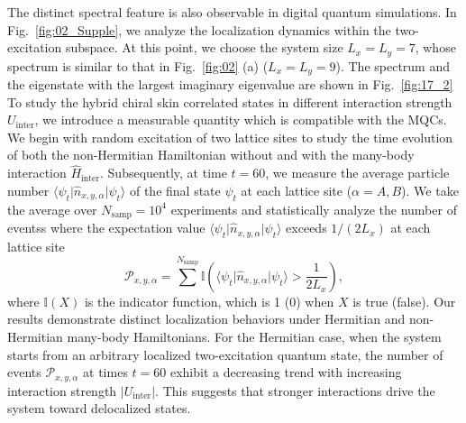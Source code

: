 \documentclass[longbibliography, aps, prx, amsmath, amssymb, amsfonts, twocolumn,superscriptaddress, footinbib]{revtex4-1}
\begin{document}
	The distinct spectral feature is also observable in digital quantum simulations. In Fig.~\ref{fig:02_Supple}, we analyze the localization dynamics within the two-excitation subspace. At this point, we choose the system size $L_x=L_y=7$, whose spectrum is similar to that in Fig.~\ref{fig:02} (a) ($L_x=L_y=9$). The spectrum and the eigenstate with the largest imaginary eigenvalue are shown in Fig.~\ref{fig:17_2}
	To study the hybrid chiral skin correlated states in different interaction strength $U_{\text{inter}}$, we introduce a measurable quantity which is compatible with the MQCs. %
	We begin with random excitation of two lattice sites to
	study the time evolution of both the non-Hermitian Hamiltonian without and with the many-body interaction $\hat{H}_{\text{inter}}$. 
	Subsequently, at time $t=60$, we measure the average particle number $\langle \psi_{t} \vert \hat{n}_{x,y,\alpha} \vert \psi_t \rangle$ of the final state $\psi_t$ at each lattice site ($\alpha=A,B$). We take the average over $N_{\text{samp}}=10^4$ experiments and statistically analyze the number of eventss where the expectation value $\langle \psi_{t} \vert \hat{n}_{x,y,\alpha} \vert \psi_t \rangle$ exceeds $1/(2L_x)$ at each lattice site
	\begin{equation}
		\mathcal{P}_{{x}, {y}, {\alpha}} = \sum^{N_{\text{samp}}} \mathbb{I}(\langle \psi_{t} \vert \hat{n}_{x,y,\alpha} \vert \psi_t \rangle > \frac{1}{2L_x}), \label{eq:NumbEvent}
	\end{equation}
	where $\mathbb{I}(X)$ is the indicator function, which is 1 (0) when $X$ is true (false).%
	Our results demonstrate distinct localization behaviors under Hermitian and non-Hermitian many-body Hamiltonians. For the Hermitian case, when the system starts from an arbitrary localized two-excitation quantum state, the number of events $\mathcal{P}_{x,y,\alpha}$ at times $t=60$ exhibit a decreasing trend with increasing interaction strength $\vert U_{\text{inter}} \vert$. This suggests that stronger interactions drive the system toward delocalized states.
\end{document}
